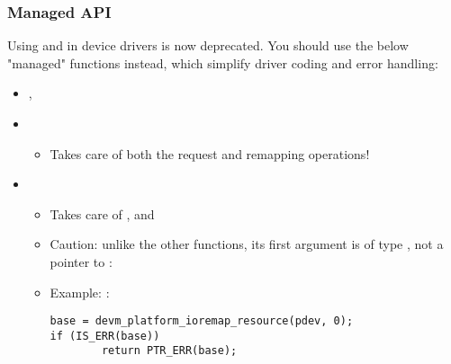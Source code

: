 \begin{frame}[fragile]
  \frametitle{Managed API}
  Using  and  in device
  drivers is now deprecated. You should use the below "managed"
  functions instead, which simplify driver coding and error handling:
  \begin{itemize}
  \item {}, 
  \item {}
        \begin{itemize}
	\item Takes care of both the request and remapping operations!
	\end{itemize}
  \item {}
        \begin{itemize}
	\item Takes care of ,
	       and 
	\item Caution: unlike the other  functions, its
	      first argument is of type , not a pointer to :
	\item Example: :
	\begin{block}{}
	\begin{verbatim}
base = devm_platform_ioremap_resource(pdev, 0);
if (IS_ERR(base))
        return PTR_ERR(base);
	\end{verbatim}
	\end{block}{}
	\end{itemize}
  \end{itemize}
\end{frame}

